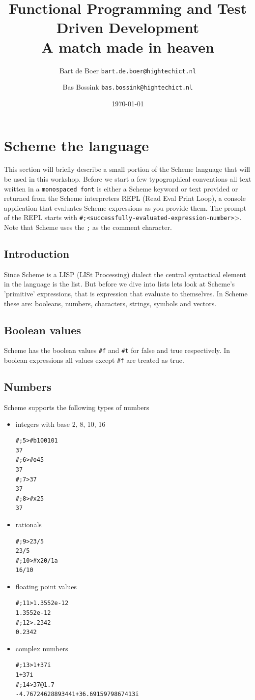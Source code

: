 \documentclass[12pt,a4paper,english,twoside]{article}
\author{
    Bart de Boer \texttt{bart.de.boer@hightechict.nl}
    \and
    Bas Bossink \texttt{bas.bossink@hightechict.nl}
}
\date{\today}
\title{Functional Programming and Test Driven Development\\
\vspace{2 mm} {\large A match made in heaven}}
\begin{document}
\maketitle
\section{Scheme the language}
This section will briefly describe a small portion of the Scheme language that 
will be used in this workshop.
Before we start a few typographical conventions all text written in a 
\texttt{monospaced font} is either a Scheme keyword or text provided or 
returned from the Scheme interpreters REPL (Read Eval Print Loop), a console 
application that evaluates Scheme expressions as you provide them. The prompt 
of the REPL starts with 
\texttt{\#;<successfully-evaluated-expression-number>$\texttt{>}$}. Note that 
Scheme uses the \texttt{;} as the comment character.  
\subsection{Introduction}
Since Scheme is a LISP (LISt Processing) dialect the central syntactical 
element in the language is the list. But before we dive into lists lets look 
at Scheme's 'primitive' expressions, that is expression that evaluate to 
themselves. In Scheme these are: booleans, numbers, characters, strings, 
symbols and vectors.
\subsection{Boolean values}
Scheme has the boolean values \texttt{\#f} and \texttt{\#t} for false and true 
respectively. In boolean expressions all values except \texttt{\#f} are 
treated as true.
\subsection{Numbers}
Scheme supports the following types of numbers
\begin{itemize}
\item integers with base 2, 8, 10, 16
\begin{lstlisting}
#;5>#b100101
37
#;6>#o45
37
#;7>37
37
#;8>#x25
37
\end{lstlisting}
\item rationals
\begin{lstlisting}
#;9>23/5
23/5
#;10>#x20/1a
16/10
\end{lstlisting}
\item floating point values
\begin{lstlisting}
#;11>1.3552e-12
1.3552e-12 
#;12>.2342
0.2342
\end{lstlisting}
\item complex numbers
\begin{lstlisting}
#;13>1+37i
1+37i
#;14>37@1.7
-4.76724628893441+36.6915979867413i
\end{lstlisting}
\end{itemize}
\end{document}
